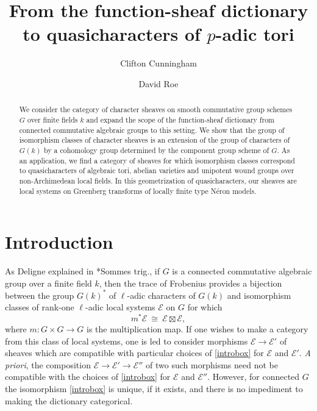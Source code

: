 \documentclass[10pt]{amsart}
\title{From the function-sheaf dictionary to quasicharacters of $p$-adic tori}
\author{Clifton Cunningham}
\author{David Roe}
\theoremstyle{plain}
\theoremstyle{definition}
\theoremstyle{remark}
\newcommand{\Fq}{k}
\newcommand{\iso}{{\ \cong\ }}
\newcommand{\cs}[1]{{\mathcal{#1}}}
\begin{document}
\begin{abstract}
We consider the category of character sheaves on smooth commutative group schemes $G$ over finite fields $k$ and expand the scope of the function-sheaf dictionary from connected commutative algebraic groups to this setting.
We show that the group of isomorphism classes of character sheaves is an extension of the group of characters of $G(k)$ by a cohomology group determined by the component group scheme of $G$.
As an application, we find a category of sheaves for which isomorphism classes correspond to quasi\-characters of algebraic tori, abelian varieties and unipotent wound groups over non-Archimedean local fields. 
In this geometrization of quasicharacters, our sheaves are local systems on
Greenberg transforms of locally finite type N\'eron models.
\end{abstract}

\maketitle

\section*{Introduction}


As Deligne explained in \cite{deligne:SGA4.5}*{Sommes trig.}, if $G$ is a connected commutative algebraic group over a finite field $k$, then the trace of Frobenius provides a bijection between the group $G(\Fq)^*$ of $\ell$-adic characters of $G(\Fq)$ and isomorphism classes of rank-one $\ell$-adic local systems $\mathcal{E}$ on $G$ for which 
\begin{equation}\label{introbox}
m^* \cs{E} \iso \cs{E} \boxtimes \cs{E},
\end{equation}
where $m : G\times G\to G$ is the multiplication map.
%
If one wishes to make a category from this class of local systems, one is led to consider morphisms $\cs{E} \to \cs{E}'$ of sheaves which are compatible with particular choices of \eqref{introbox} for $\cs{E}$ and $\cs{E'}$. 
{\it A priori}, the composition $\cs{E} \to \cs{E}' \to \cs{E}''$ of two such morphisms need not be compatible with the choices of \eqref{introbox} for $\cs{E}$ and $\cs{E}''$.
 However, for connected $G$ the isomorphism \eqref{introbox} is unique, if it exists, and there is no impediment to making the dictionary categorical.
\end{document}
